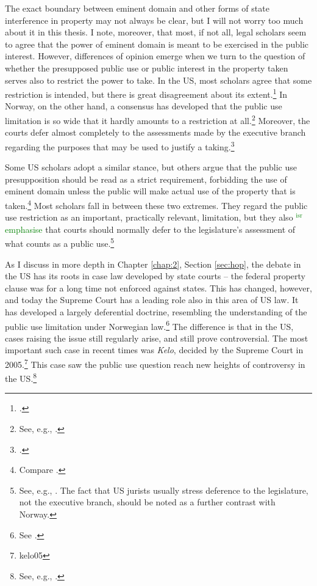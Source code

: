 \documentclass[12pt,a4paper]{book} %
\newcommand{\isr}[1]{\textcolor{green}{$^{\textrm{isr}}${#1}}}
\begin{document}
The exact boundary between eminent domain and other forms of state interference in property may not always be clear, but I will not worry too much about it in this thesis. I note, moreover, that most, if not all, legal scholars seem to agree that the power of eminent domain is meant to be exercised in the public interest. However, differences of opinion emerge when we turn to the question of whether the presupposed public use or public interest in the property taken serves also to restrict the power to take. In the US, most scholars agree that some restriction is intended, but there is great disagreement about its extent.\footcite[205]{berger78} In Norway, on the other hand, a consensus has developed that the public use limitation is so wide that it hardly amounts to a restriction at all.\footnote{See, e.g., \cite[368]{aall10}.} Moreover, the courts defer almost completely to the assessments made by the executive branch regarding the purposes that may be used to justify a taking.\footcite[368]{aall10}

Some US scholars adopt a similar stance, but others argue that the public use presupposition should be read as a strict requirement, forbidding the use of eminent domain unless the public will make actual use of the property that is taken.\footnote{Compare \cite{bell06,bell09,claeys04,sandefur06}.} Most scholars fall in between these two extremes. They regard the public use restriction as an important, practically relevant, limitation, but they also \isr{emphasise} that courts should normally defer to the legislature's assessment of what counts as a public use.\footnote{See, e.g., \cite{merrill86,alexander05}. The fact that US jurists usually stress deference to the legislature, not the executive branch, should be noted as a further contrast with Norway.}

As I discuss in more depth in Chapter \ref{chap:2}, Section \ref{sec:hop}, the debate in the US has its roots in case law developed by state courts -- the federal property clause was for a long time not enforced against states. This has changed, however, and today the Supreme Court has a leading role also in this area of US law. It has developed a largely deferential doctrine, resembling the understanding of the public use limitation under Norwegian law.\footnote{See \cite{berman54,midkiff84,kelo05}.} The difference is that in the US, cases raising the issue  still regularly arise, and still prove controversial. The most important such case in recent times was {\it Kelo}, decided by the Supreme Court in 2005.\footnote{kelo05} This case saw the public use question reach new heights of controversy in the US.\footnote{See, e.g., \cite{somin09}.}
\end{document}
